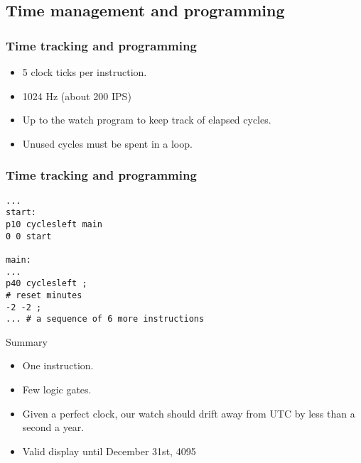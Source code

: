 \documentclass{beamer}
\begin{document}
\subsection{Time management and programming}
\begin{frame}
  \frametitle{Time tracking and programming}
  \begin{itemize}
    \item 5 clock ticks per instruction.
    \item 1024 Hz (about 200 IPS)
    \item<2-> Up to the watch program to keep track of elapsed cycles.
    \item<3-> Unused cycles must be spent in a loop.
  \end{itemize}
\end{frame}

\begin{frame}[fragile]
  \frametitle{Time tracking and programming}
    \begin{verbatim}
...
start:
p10 cyclesleft main
0 0 start

main:
...
p40 cyclesleft ;
# reset minutes
-2 -2 ;
... # a sequence of 6 more instructions
    \end{verbatim}
\end{frame}

\begin{frame}{Summary}
  \begin{itemize}
    \item<2-> One instruction.
    \item<3-> Few logic gates. %
    \item<4-> Given a perfect clock, our watch should drift away from UTC
      by less than a second a year. %
    \item<5-> Valid display until December 31st, 4095
  \end{itemize}
\end{frame}
\end{document}
